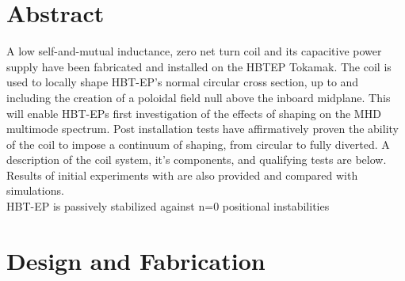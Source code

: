 \documentclass{article}
\begin{document}
\begin{multicols}{5}
\section{Abstract}

A low self-and-mutual inductance, zero net turn coil and its capacitive power supply have been fabricated and installed on the HBTEP Tokamak.  The coil is used to locally shape HBT-EP's normal circular cross section, up to and including the creation of a poloidal field null above the inboard midplane.  This will enable HBT-EPs first investigation of the effects of shaping on the MHD multimode spectrum.  Post installation tests have affirmatively proven the ability of the coil to impose a continuum of shaping, from circular to fully diverted. A description of the coil system, it's components, and qualifying tests are below.  Results of initial experiments with are also provided and compared with simulations.\\

 HBT-EP is passively stabilized against n=0 positional instabilities


\section{Design and Fabrication}

\end{multicols}
\end{document}
